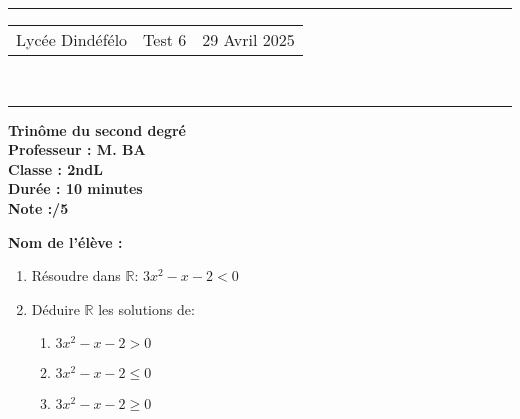 \documentclass[a4paper,12pt]{article}
\begin{document}
\hrule %
\begin{center}
    \begin{tabular}{@{} p{5cm} p{5cm} p{5cm} @{}} %
        Lycée Dindéfélo & \quad\quad\quad Test 6 & 29 Avril 2025 \\
    \end{tabular}
    \\[-0.01cm] %
    \hrule %
\end{center}
\begin{center}
    \textbf{\Large Trinôme du second degré} \\[0.2cm]
    \textbf{\large Professeur : M. BA} \\[0.2cm]
    \textbf{Classe : 2ndL} \\[0.2cm]
    \textbf{\small Durée : 10 minutes} \\[0.2cm]
    \textbf{\small Note :\quad\quad\quad /5}
\end{center}

\textbf{\small Nom de l'élève :} \underline{\hspace{8cm}} \\[0.5cm]

\begin{enumerate}
    \item Résoudre dans \(\mathbb{R}\): \( 3x^2 - x - 2 < 0\)

    \item Déduire \(\mathbb{R}\) les solutions de:
\begin{enumerate}
    \item \( 3x^2 - x - 2 > 0 \)
    \item \( 3x^2 - x - 2 \leq 0 \)
    \item \( 3x^2 - x - 2 \geq 0 \)
\end{enumerate}
\end{enumerate}
\end{document}
